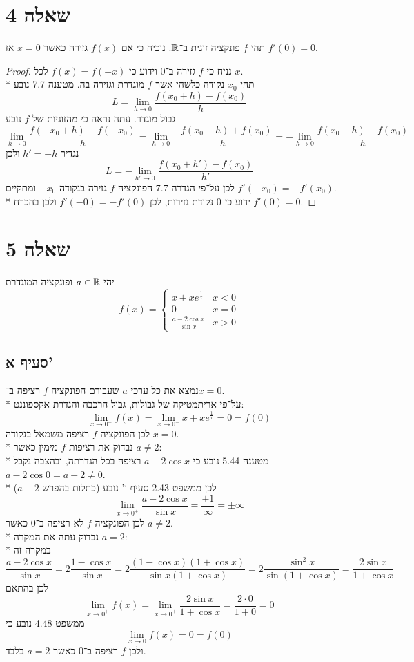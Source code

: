 \section{שאלה 4}
תהי $f$ פונקציה זוגית ב־$\mathbb{R}$. נוכיח כי אם $f(x)$ גזירה כאשר $x = 0$ אז $f'(0) = 0$.
\begin{proof}
	נניח כי $f$ גזירה ב־$0$ וידוע כי $f(x) = f(-x)$ לכל $x$. \\*
	תהי $x_0$ נקודה כלשהי אשר $f$ מוגדרת וגזירה בה. מטענה 7.7 נובע
	\[
		L = \lim_{h \to 0} \frac{f(x_0 + h) - f(x_0)}{h}
	\]
	גבול מוגדר. עתה נראה כי מהזוגיות של $f$ נובע
	\[
		\lim_{h \to 0} \frac{f(-x_0 + h) - f(-x_0)}{h}
		= \lim_{h \to 0} \frac{- f(x_0 - h) + f(x_0)}{h}
		= - \lim_{h \to 0} \frac{f(x_0 - h) - f(x_0)}{h}
	\]
	נגדיר $h' = -h$ ולכן
	\[
		L = - \lim_{h' \to 0} \frac{f(x_0 + h') - f(x_0)}{h'}
	\]
	לכן על־פי הגדרה 7.7 הפונקציה $f$ גזירה בנקודה $-x_0$ ומתקיים $f'(-x_0) = -f'(x_0)$. \\*
	ידוע כי $0$ נקודת גזירות, לכן $f'(-0) = -f'(0)$ ולכן בהכרח $f'(0) = 0$.
\end{proof}

\section{שאלה 5}
יהי $a \in \mathbb{R}$ ופונקציה המוגדרת
\[
	f(x) = \begin{cases}
		x + x e^{\frac{1}{x}} & x < 0 \\
		0 & x = 0 \\
		\frac{a - 2 \cos x}{\sin x} & x > 0
	\end{cases}
\]

\subsection{סעיף א'}
נמצא את כל ערכי $a$ שעבורם הפונקציה $f$ רציפה ב־$x = 0$. \\*
על־פי אריתמטיקה של גבולות, גבול הרכבה והגדרת אקספוננט:
\[
	\lim_{x \to 0^-} f(x) = 
	\lim_{x \to 0^-} x + x e^{\frac{1}{x}}
	= 0 = f(0)
\]
לכן הפונקציה $f$ רציפה משמאל בנקודה $x = 0$. \\*
נבדוק את רציפות $f$ מימין כאשר $a \ne 2$: \\*
מטענה 5.44 נובע כי $a - 2 \cos x$ רציפה בכל הגדרתה, ובהצבה נקבל $a - 2 \cos 0 = a - 2 \ne 0$. \\*
לכן ממשפט 2.43 סעיף ו' נובע (כתלות בהפרש $a - 2$)
\[
	\lim_{x \to 0^+} \frac{a - 2 \cos x}{\sin x} = \frac{\pm1}{\infty} = \pm \infty
\]
לכן הפונקציה $f$ לא רציפה ב־$0$ כאשר $a \ne 2$. \\*
נבדוק עתה את המקרה $a = 2$: \\*
במקרה זה
\[
	\frac{a - 2 \cos x}{\sin x}
	= 2 \frac{1 - \cos x}{\sin x}
	= 2 \frac{(1 - \cos x)(1 + \cos x)}{\sin x(1 + \cos x)}
	= 2 \frac{\sin^2 x}{\sin (1 + \cos x)}
	= \frac{2 \sin x}{1 + \cos x}
\]
לכן בהתאם
\[
	\lim_{x \to 0^+} f(x) = \lim_{x \to 0^+} \frac{2 \sin x}{1 + \cos x} = \frac{2 \cdot 0}{1 + 0} = 0
\]
ממשפט 4.48 נובע כי
\[
	\lim_{x \to 0} f(x) = 0 = f(0)
\]
ולכן $f$ רציפה ב־$0$ כאשר $a = 2$ בלבד.

